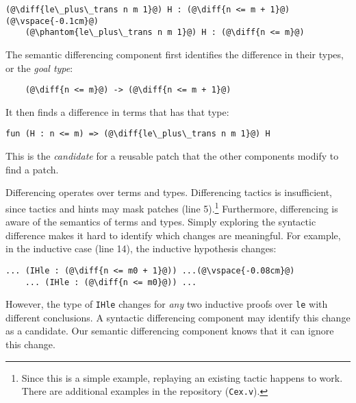 \begin{lstlisting}[language=coq]
    (@\diff{le\_plus\_trans n m 1}@) H : (@\diff{n <= m + 1}@)(@\vspace{-0.1cm}@)
    (@\phantom{le\_plus\_trans n m 1}@) H : (@\diff{n <= m}@)
\end{lstlisting}

The semantic differencing component first identifies the difference in their types, or the \textit{goal type}:

\begin{lstlisting}
    (@\diff{n <= m}@) -> (@\diff{n <= m + 1}@)
\end{lstlisting}

It then finds a difference in terms that has that type:

\begin{lstlisting}[language=coq]
    fun (H : n <= m) => (@\diff{le\_plus\_trans n m 1}@) H
\end{lstlisting}


This is the \emph{candidate} for a reusable patch that the other components modify to find a patch.

Differencing operates over terms and types. Differencing tactics
is insufficient, since tactics and hints may mask patches
(line 5).\footnote{Since this is a simple example, replaying an existing tactic happens to work. There
are additional examples in the repository (\lstinline{Cex.v}).}
Furthermore, differencing is aware of the semantics of terms and types.
Simply exploring the syntactic difference %
makes it hard to identify
which changes are meaningful.
For example, in the inductive case (line 14), the inductive hypothesis
changes:

\begin{lstlisting}[language=coq]
    ... (IHle : (@\diff{n <= m0 + 1}@)) ...(@\vspace{-0.08cm}@)
    ... (IHle : (@\diff{n <= m0}@)) ...
\end{lstlisting}

However, the type of \lstinline{IHle} changes for \emph{any} two inductive proofs over \lstinline{le}
with different conclusions. A syntactic differencing component 
may identify this change as a candidate.
Our semantic differencing component knows that it can ignore this change.

